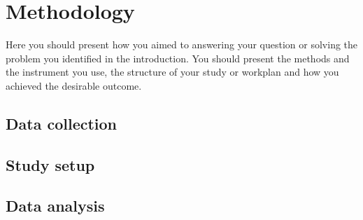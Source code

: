 \chapter{Methodology}
\label{sec:Methodology}

Here you should present how you aimed to answering your question or solving the problem you identified in the introduction.
You should present the methods and the instrument you use, the structure of your study or workplan and how you achieved the desirable outcome.

\section{Data collection}

\section{Study setup}

\section{Data analysis}

